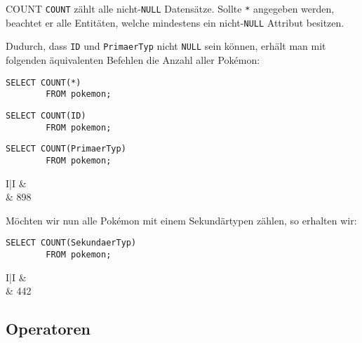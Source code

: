 \begin{sql}{COUNT}
    \texttt{COUNT} zählt alle nicht-\texttt{NULL} Datensätze.
    Sollte \texttt{*} angegeben werden, beachtet er alle Entitäten, welche mindestens ein nicht-\texttt{NULL} Attribut besitzen.

    Dudurch, dass \texttt{ID} und \texttt{PrimaerTyp} nicht \texttt{NULL} sein können, erhält man mit folgenden äquivalenten Befehlen die Anzahl aller Pokémon:

    \begin{lstlisting}[language=mysql]
        SELECT COUNT(*)
        FROM pokemon;
    \end{lstlisting}

    \begin{lstlisting}[language=mysql]
        SELECT COUNT(ID)
        FROM pokemon;
    \end{lstlisting}

    \begin{lstlisting}[language=mysql]
        SELECT COUNT(PrimaerTyp)
        FROM pokemon;
    \end{lstlisting}

    \setcounter{rownum}{0}
    \begin{tabular}{I|I}
        &  \\ & 898 \\
    \end{tabular}

    Möchten wir nun alle Pokémon mit einem Sekundärtypen zählen, so erhalten wir: 

    \begin{lstlisting}[language=mysql]
        SELECT COUNT(SekundaerTyp)
        FROM pokemon;
    \end{lstlisting}

    \setcounter{rownum}{0}
    \begin{tabular}{I|I}
        &  \\ & 442 \\
    \end{tabular}
\end{sql}

\subsection{Operatoren}

